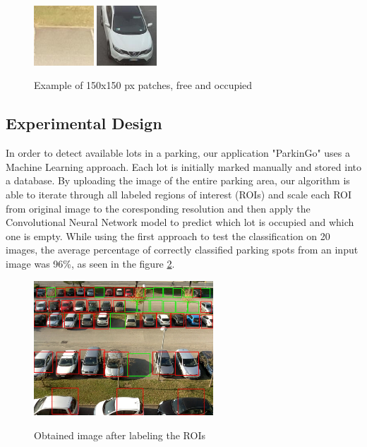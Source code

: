 \documentclass[12pt]{article}
\begin{document}
\begin{figure}
\caption{Example of 150x150 px patches, free and occupied}
\includegraphics[width=0.2\textwidth]{20150703_0810_10}
\includegraphics[width=0.2\textwidth]{20150703_0810_45}
\label{fig:patchesimg}
\end{figure}

\clearpage
\subsection{Experimental Design}
In order to detect available lots in a parking, our application "ParkinGo" uses a Machine Learning approach.
Each lot is initially marked manually and stored into a database. By uploading the image of the entire parking area,
our algorithm is able to iterate through all labeled regions of interest (ROIs) and scale each ROI from original image to the coresponding resolution 
and then apply the Convolutional Neural Network model to predict which lot is occupied and which one is empty.
While using the first approach to test the classification on 20 images, the average percentage of correctly classified parking spots from an input image was 96\%, as seen in the figure \ref{fig:resultimg}.



\begin{figure}
\caption{Obtained image after labeling the ROIs}
\includegraphics[width=0.6\textwidth]{2015-11-12_0947}
\label{fig:resultimg}
\end{figure}

\clearpage


\end{document}
